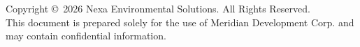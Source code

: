 \begin{titlepage}
\vfill

\begin{center}
  \small\color{secondary}
  Copyright \copyright\ 2026 Nexa Environmental Solutions. All Rights Reserved. \\
  This document is prepared solely for the use of Meridian Development Corp. and may contain confidential information.
\end{center}
\end{titlepage}
\newpage

